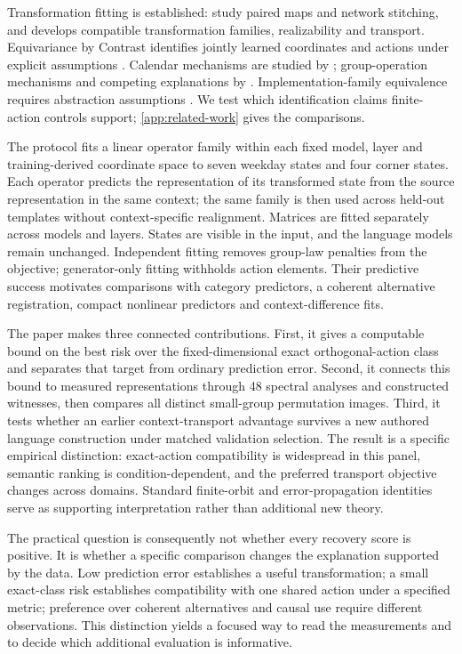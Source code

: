 \documentclass[10pt]{article}
\begin{document}
Transformation fitting is established: \citet{lenc2015understanding} study paired maps and network stitching, and \citet{sun2026transformationlaws} develops compatible transformation families, realizability and transport. Equivariance by Contrast identifies jointly learned coordinates and actions under explicit assumptions \citep{schmidt2025equivariance}. Calendar mechanisms are studied by \citet{engels2025notall}; group-operation mechanisms and competing explanations by \citet{nanda2023progress,chughtai2023toy,wu2025unified}. Implementation-family equivalence requires abstraction assumptions \citep{sun2026tracking}. We test which identification claims finite-action controls support; \cref{app:related-work} gives the comparisons.

The protocol fits a linear operator family within each fixed model, layer and training-derived coordinate space to seven weekday states and four corner states. Each operator predicts the representation of its transformed state from the source representation in the same context; the same family is then used across held-out templates without context-specific realignment. Matrices are fitted separately across models and layers. States are visible in the input, and the language models remain unchanged. Independent fitting removes group-law penalties from the objective; generator-only fitting withholds action elements. Their predictive success motivates comparisons with category predictors, a coherent alternative registration, compact nonlinear predictors and context-difference fits.



The paper makes three connected contributions. First, it gives a computable bound on the best risk over the fixed-dimensional exact orthogonal-action class and separates that target from ordinary prediction error. Second, it connects this bound to measured representations through 48 spectral analyses and constructed witnesses, then compares all distinct small-group permutation images. Third, it tests whether an earlier context-transport advantage survives a new authored language construction under matched validation selection. The result is a specific empirical distinction: exact-action compatibility is widespread in this panel, semantic ranking is condition-dependent, and the preferred transport objective changes across domains. Standard finite-orbit and error-propagation identities serve as supporting interpretation rather than additional new theory.

The practical question is consequently not whether every recovery score is positive. It is whether a specific comparison changes the explanation supported by the data. Low prediction error establishes a useful transformation; a small exact-class risk establishes compatibility with one shared action under a specified metric; preference over coherent alternatives and causal use require different observations. This distinction yields a focused way to read the measurements and to decide which additional evaluation is informative.
\end{document}
